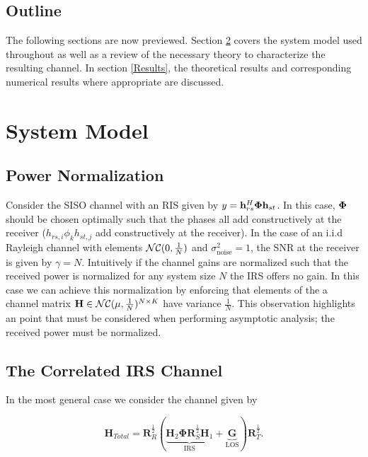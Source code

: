 \documentclass[12pt,a4paper]{report}
\begin{document}
\section{Outline}
The following sections are now previewed. Section \ref{system_model} covers the system model used throughout as well as a review of the necessary theory to characterize the resulting channel. In section \ref{Results}, the theoretical results and corresponding numerical results where appropriate are discussed. 

\chapter{System Model}\label{system_model}
\section{Power Normalization}
Consider the SISO channel with an RIS given by $y = \mathbf{h}_{rs}^H \boldsymbol{\Phi} \mathbf{h}_{st}$. In this case, $ \boldsymbol{\Phi}$ should be chosen optimally such that 
the phases all add constructively at the receiver (\ie $h_{rs,i} \phi_k h_{st,j}$ add constructively at the receiver). 
In the case of an i.i.d Rayleigh channel with elements $\mathcal{NC}(0,\frac{1}{N})$ and $\sigma^2_{\text{noise}} =1$, the SNR at the receiver is given by $\gamma = N$.
Intuitively if the channel gains are normalized such that the received power is normalized for any system size $N$ the IRS offers no gain. 
In this case we can achieve this normalization by enforcing that elements of the a channel matrix $\mathbf{H} \in \mathcal{NC}(\mu,\frac{1}{N})^{N \times K}$ have variance $\frac{1}{N}$.
This observation highlights an point that must be considered when performing asymptotic analysis; the received power must be normalized.


\section{The Correlated IRS Channel}
In the most general case we consider the channel given by 

	\begin{equation}
	\mathbf{H}_{Total} = \mathbf{R}_{R}^{\frac{1}{2}}(\underbrace{\mathbf{H}_{2}\boldsymbol{\Phi}\mathbf{R}_{S}^{\frac{1}{2}}\mathbf{H}_{1}}_{\text{IRS}} + \underbrace{\mathbf{G}}_{\text{LOS}})\mathbf{R}_{T}^{\frac{1}{2}}.
	\end{equation}
\end{document}
